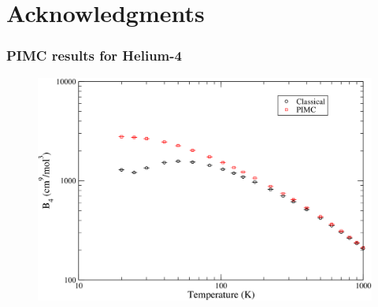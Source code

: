 \documentclass[xcolor=svgnames]{beamer}
\begin{document}
	\section*{Acknowledgments}

	\begin{frame}
	\frametitle{PIMC results for Helium-4}
	\begin{figure}
	\centering
	\includegraphics[scale=0.2,keepaspectratio]{B4-Kate.png}
	\end{figure}
	\end{frame}
\end{document}
